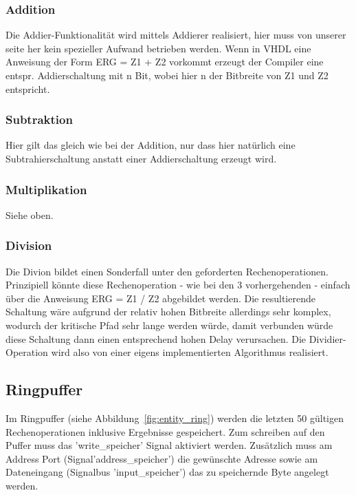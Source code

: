 \subsubsection{Addition}

Die Addier-Funktionalität wird mittels Addierer realisiert, hier muss von unserer seite her kein spezieller Aufwand betrieben werden.
Wenn in VHDL eine Anweisung der Form ERG = Z1 + Z2 vorkommt erzeugt der Compiler eine entspr. Addierschaltung mit n Bit, wobei hier n der Bitbreite von Z1 und Z2 entspricht.

\subsubsection{Subtraktion}

Hier gilt das gleich wie bei der Addition, nur dass hier natürlich eine Subtrahierschaltung anstatt einer Addierschaltung erzeugt wird.

\subsubsection{Multiplikation}

Siehe oben.

\subsubsection{Division}

Die Divion bildet einen Sonderfall unter den geforderten Rechenoperationen. Prinzipiell könnte diese Rechenoperation - wie bei den 3 vorhergehenden - einfach über die Anweisung ERG = Z1 / Z2 abgebildet werden. Die resultierende Schaltung wäre aufgrund der relativ hohen Bitbreite allerdings sehr komplex, wodurch der kritische Pfad sehr lange werden würde, damit verbunden würde diese Schaltung dann einen entsprechend hohen Delay verursachen. Die Dividier-Operation wird also von einer eigens implementierten Algorithmus realisiert. 

\subsection{Ringpuffer}

Im Ringpuffer (siehe Abbildung~\ref{fig:entity_ring}) werden die letzten 50 gültigen Rechenoperationen inklusive Ergebnisse gespeichert. Zum schreiben auf den Puffer muss das 'write\_speicher' Signal aktiviert werden. Zusätzlich muss am Address Port (Signal'address\_speicher') die gewünschte Adresse sowie am Dateneingang (Signalbus 'input\_speicher') das zu speichernde Byte angelegt werden.

